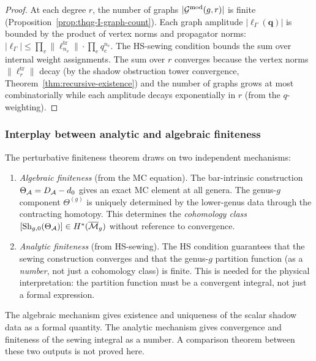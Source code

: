 \begin{proof}
At each degree $r$, the number of graphs $|\mathcal{G}^{\mathrm{mod}}(g,r)|$ is finite (Proposition~\ref{prop:thqg-I-graph-count}). Each graph amplitude $|\ell_\Gamma(\mathbf{q})|$ is bounded by the product of vertex norms and propagator norms: $|\ell_\Gamma| \leq \prod_{v} \|\ell_{n_v}^{\mathrm{tr}}\| \cdot \prod_{e} q_e^{n_e}$. The HS-sewing condition bounds the sum over internal weight assignments. The sum over $r$ converges because the vertex norms $\|\ell_r^{\mathrm{tr}}\|$ decay (by the shadow obstruction tower convergence, Theorem~\ref{thm:recursive-existence}) and the number of graphs grows at most combinatorially while each amplitude decays exponentially in $r$ (from the $q$-weighting).
\end{proof}

\subsubsection{Interplay between analytic and algebraic finiteness}

\begin{remark}
\label{rem:thqg-I-two-mechanisms}
The perturbative finiteness theorem draws on two independent mechanisms:
\begin{enumerate}[label=\textup{(\roman*)}]
\item \emph{Algebraic finiteness} (from the MC equation). The bar-intrinsic construction $\Theta_{\mathcal{A}} = D_{\mathcal{A}} - d_0$ gives an exact MC element at all genera. The genus-$g$ component $\Theta^{(g)}$ is uniquely determined by the lower-genus data through the contracting homotopy. This determines the \emph{cohomology class} $[\operatorname{Sh}_{g,0}(\Theta_{\mathcal{A}})] \in H^*(\overline{\mathcal{M}}_g)$ without reference to convergence.
\item \emph{Analytic finiteness} (from HS-sewing). The HS condition guarantees that the sewing construction converges and that the genus-$g$ partition function (as a \emph{number}, not just a cohomology class) is finite. This is needed for the physical interpretation: the partition function must be a convergent integral, not just a formal expression.
\end{enumerate}
The algebraic mechanism gives existence and uniqueness of the scalar
shadow data as a formal quantity. The analytic mechanism gives
convergence and finiteness of the sewing integral as a number. A
comparison theorem between these two outputs is not proved here.
\end{remark}

